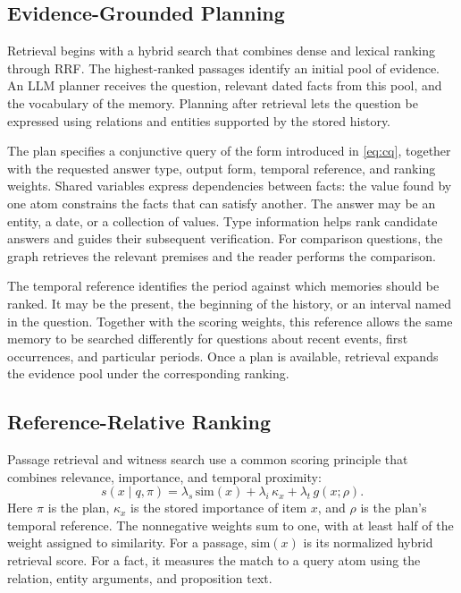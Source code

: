 \subsection{Evidence-Grounded Planning}
\label{sec:method-plan}

Retrieval begins with a hybrid search that combines dense and lexical
ranking through \ac{RRF}. The highest-ranked passages identify an initial
pool of evidence. An \ac{LLM} planner receives the question, relevant
dated facts from this pool, and the vocabulary of the memory. Planning
after retrieval lets the question be expressed using relations and
entities supported by the stored history.

The plan specifies a conjunctive query of the form introduced in
\cref{eq:cq}, together with the requested answer type, output form,
temporal reference, and ranking weights. Shared variables express
dependencies between facts: the value found by one atom constrains the
facts that can satisfy another. The answer may be an entity, a date, or
a collection of values. Type information helps rank candidate answers
and guides their subsequent verification. For comparison questions,
the graph retrieves the relevant premises and the reader performs the
comparison.

The temporal reference identifies the period against which memories
should be ranked. It may be the present, the beginning of the history,
or an interval named in the question. Together with the scoring weights,
this reference allows the same memory to be searched differently for
questions about recent events, first occurrences, and particular periods.
Once a plan is available, retrieval expands the evidence pool under
the corresponding ranking.

\subsection{Reference-Relative Ranking}
\label{sec:method-score}

Passage retrieval and witness search use a common scoring principle
that combines relevance, importance, and temporal proximity:
\begin{equation}
 s(x\mid q,\pi)=
 \lambda_s\,\mathrm{sim}(x)
 +\lambda_i\,\kappa_x
 +\lambda_t\,g(x;\rho).
 \label{eq:score}
\end{equation}
Here $\pi$ is the plan, $\kappa_x$ is the stored importance of item $x$,
and $\rho$ is the plan's temporal reference. The nonnegative weights sum
to one, with at least half of the weight assigned to similarity.
For a passage, $\mathrm{sim}(x)$ is its normalized hybrid retrieval
score. For a fact, it measures the match to a query atom using the
relation, entity arguments, and proposition text.

